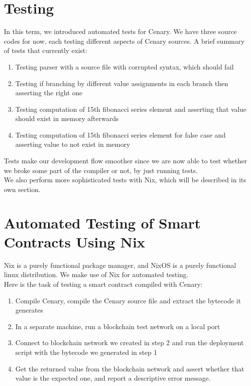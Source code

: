 \documentclass{article}
\begin{document}
\section{Testing}
In this term, we introduced automated tests for Cenary. We have three source codes for now, each testing different aspects of Cenary sources. A brief summary of tests that currently exist:
\begin{enumerate}
  \item Testing parser with a source file with corrupted syntax, which should fail
  \item Testing if branching by different value assignments in each branch then asserting the right one
  \item Testing computation of 15th fibonacci series element and asserting that value should exist in memory afterwards
  \item Testing computation of 15th fibonacci series element for false case and asserting value to not exist in memory
\end{enumerate}

Tests make our development flow smoother since we are now able to test whether we broke some part of the compiler or not, by just running tests. \\

We also perform more sophisticated tests with Nix, which will be described in its own section.

\section{Automated Testing of Smart Contracts Using Nix}
\label{sec:nix_tests}
Nix\cite{nix} is a purely functional package manager, and NixOS\cite{nixos} is a purely functional linux distribution. We make use of Nix for automated testing. \\

Here is the task of testing a smart contract compiled with Cenary:
\begin{enumerate}
  \item Compile Cenary, compile the Cenary source file and extract the bytecode it generates
  \item In a separate machine, run a blockchain test network on a local port
  \item Connect to blockchain network we created in step 2 and run the deployment script with the bytecode we generated in step 1
  \item Get the returned value from the blockchain network and assert whether that value is the expected one, and report a descriptive error message.
\end{enumerate}
\end{document}
